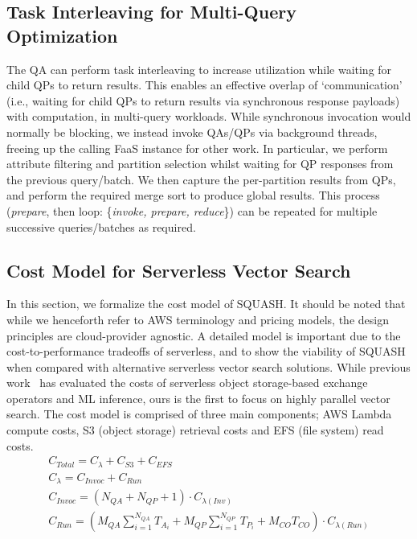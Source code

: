 
% 


\subsection{Task Interleaving for Multi-Query Optimization}
The QA can perform task interleaving to increase utilization while waiting for child QPs to return results. This enables an effective overlap of `communication' (i.e., waiting for child QPs to return results via synchronous response payloads) with computation, in multi-query workloads.
While synchronous invocation would normally be blocking, we instead invoke QAs/QPs via background threads, freeing up the calling FaaS instance for other work. In particular,
we perform attribute filtering and partition selection 
whilst waiting for QP responses from the previous query/batch. We then capture the per-partition results from QPs, and perform the required merge sort to produce global results. 
This process (\textit{prepare}, then loop: \{\textit{invoke, prepare, reduce}\}) can be repeated for multiple successive queries/batches as required. 


\subsection{Cost Model for Serverless Vector Search}
\label{s:5-squash-cost-model}

In this section, we formalize the cost model of SQUASH. 
It should be noted that while we henceforth refer to AWS terminology and pricing models, the design principles are cloud-provider agnostic. %
A detailed model is important due to the cost-to-performance tradeoffs of serverless, and to show the viability of SQUASH when compared with alternative serverless vector search solutions.
While previous work~\cite{Muller2020Lambada, Oakley2024FSDInference} has evaluated the costs of serverless object storage-based exchange operators and ML inference, ours is the first to focus on highly parallel vector search.
The cost model is comprised of three main components; AWS Lambda compute costs, S3 (object storage) retrieval costs and EFS (file system) read costs.
\begin{gather}
    C_{Total} = C_{\lambda} + C_{S3} + C_{EFS} \label{eq-cost-total}\\
    C_{\lambda} = C_{Invoc} + C_{Run}\label{eq-cost-lambda}\\
    C_{Invoc} = (N_{QA} + N_{QP} + 1)\cdot C_{\lambda(Inv)}\label{eq-cost-lambda-invoc}\\
    C_{Run} = (M_{QA}\sum_{i=1}^{N_{QA}}T_{A_i} + M_{QP}\sum_{i=1}^{N_{QP}}T_{P_i} + M_{CO}T_{CO}) \cdot C_{\lambda(Run)}\label{eq-cost-lambda-run}
\end{gather}

